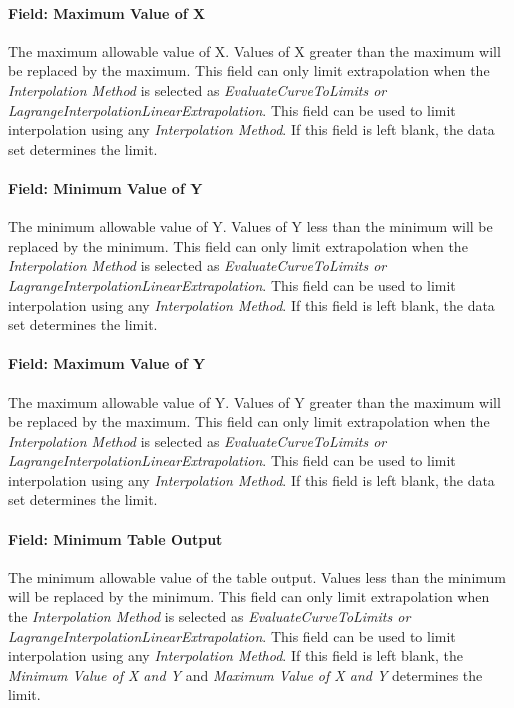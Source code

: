 \paragraph{Field: Maximum Value of X}\label{field-maximum-value-of-x-1-000}

The maximum allowable value of X. Values of X greater than the maximum will be replaced by the maximum. This field can only limit extrapolation when the \emph{Interpolation Method} is selected as \emph{EvaluateCurveToLimits or LagrangeInterpolationLinearExtrapolation}. This field can be used to limit interpolation using any \emph{Interpolation Method}. If this field is left blank, the data set determines the limit.

\paragraph{Field: Minimum Value of Y}\label{field-minimum-value-of-y-000}

The minimum allowable value of Y. Values of Y less than the minimum will be replaced by the minimum. This field can only limit extrapolation when the \emph{Interpolation Method} is selected as \emph{EvaluateCurveToLimits or LagrangeInterpolationLinearExtrapolation}. This field can be used to limit interpolation using any \emph{Interpolation Method}. If this field is left blank, the data set determines the limit.

\paragraph{Field: Maximum Value of Y}\label{field-maximum-value-of-y-000}

The maximum allowable value of Y. Values of Y greater than the maximum will be replaced by the maximum. This field can only limit extrapolation when the \emph{Interpolation Method} is selected as \emph{EvaluateCurveToLimits or LagrangeInterpolationLinearExtrapolation}. This field can be used to limit interpolation using any \emph{Interpolation Method}. If this field is left blank, the data set determines the limit.

\paragraph{Field: Minimum Table Output}\label{field-minimum-table-output-1}

The minimum allowable value of the table output. Values less than the minimum will be replaced by the minimum. This field can only limit extrapolation when the \emph{Interpolation Method} is selected as \emph{EvaluateCurveToLimits or LagrangeInterpolationLinearExtrapolation}. This field can be used to limit interpolation using any \emph{Interpolation Method}. If this field is left blank, the \emph{Minimum Value of X and Y} and \emph{Maximum Value of X and Y} determines the limit.

